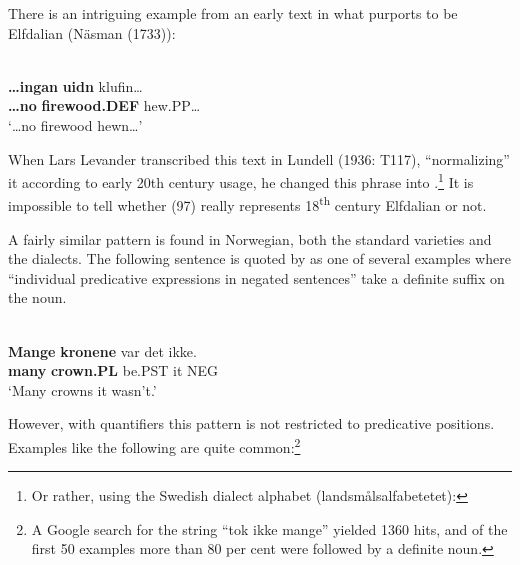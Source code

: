 \z

There is an intriguing example from an early text in what purports to be Elfdalian (Näsman (1733)):


\ea \label{} 
\\
\gll \textbf{…ingan} \textbf{uidn} klufin…\\
\textbf{…no} \textbf{firewood.DEF} hew.PP…\\
\glt ‘…no firewood hewn…’

\z

When Lars Levander transcribed this text in Lundell (1936: T117), “normalizing” it according to early 20th century usage, he changed this phrase into .\footnote{ Or rather, using the Swedish dialect alphabet (landsmålsalfabetetet):  }\textit{ }It is impossible to tell whether (97) really represents 18\textsuperscript{th} century Elfdalian or not. 


A fairly similar pattern is found in Norwegian, both the standard varieties and the dialects. The following sentence is quoted by \citet[302]{FaarlundEtAl1997} as one of several examples where “individual predicative expressions in negated sentences” take a definite suffix on the noun. 


\ea \label{} 
\\
\gll \textbf{Mange} \textbf{  kronene} var  det  ikke.\\
\textbf{many} \textbf{crown.PL} be.PST  it  NEG\\
\glt ‘Many crowns it wasn’t.’

\z

However, with quantifiers this pattern is not restricted to predicative positions. Examples like the following are quite common:\footnote{ A Google search for the string “tok ikke mange” yielded 1360 hits, and of the first 50 examples more than 80 per cent were followed by a definite noun.}

